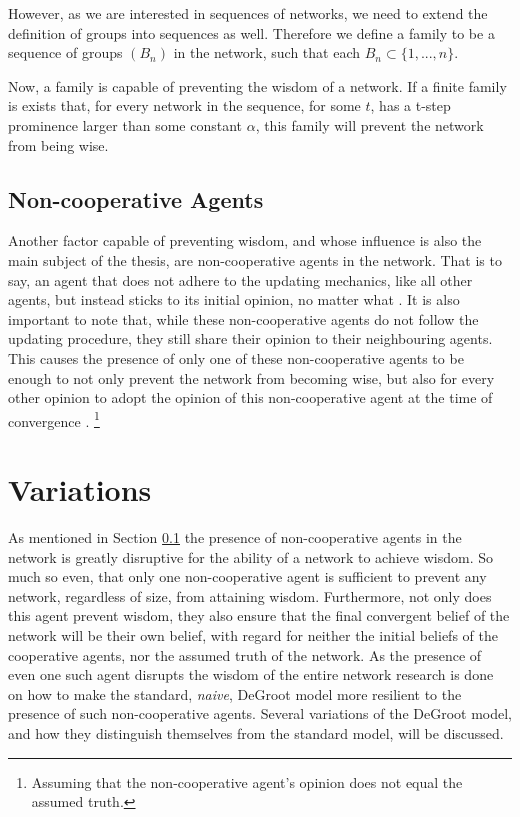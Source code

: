 \documentclass[a4paper, 12pt]{report}
\begin{document}
\noindent However, as we are interested in sequences of networks, we need to extend the definition of groups into sequences as well. Therefore we define a family to be a sequence of groups $(B_n)$ in the network, such that each $B_n \subset \{1, ..., n\}$.

\noindent Now, a family is capable of preventing the wisdom of a network. If a finite family is exists that, for every network in the sequence, for some $t$, has a t-step prominence larger than some constant $\alpha$, this family will prevent the network from being wise.


\subsection{Non-cooperative Agents}
\label{non-coop}

Another factor capable of preventing wisdom, and whose influence is also the main subject of the thesis, are non-cooperative agents in the network. That is to say, an agent that does not adhere to the updating mechanics, like all other agents, but instead sticks to its initial opinion, no matter what \parencite{amir2021robust}. It is also important to note that, while these non-cooperative agents do not follow the updating procedure, they still share their opinion to their neighbouring agents. This causes the presence of only one of these non-cooperative agents to be enough to not only prevent the network from becoming wise, but also for every other opinion to adopt the opinion of this non-cooperative agent at the time of convergence \parencite{amir2021robust}. \footnote{Assuming that the non-cooperative agent's opinion does not equal the assumed truth.}



\section{Variations}

As mentioned in Section \ref{non-coop} the presence of non-cooperative agents in the network is greatly disruptive for the ability of a network to achieve wisdom. So much so even, that only one non-cooperative agent is sufficient to prevent any network, regardless of size, from attaining wisdom. Furthermore, not only does this agent prevent wisdom, they also ensure that the final convergent belief of the network will be their own belief, with regard for neither the initial beliefs of the cooperative agents, nor the assumed truth of the network. As the presence of even one such agent disrupts the wisdom of the entire network research is done on how to make the standard, \emph{naive}, DeGroot model more resilient to the presence of such non-cooperative agents. Several variations of the DeGroot model, and how they distinguish themselves from the standard model, will be discussed.
\end{document}
